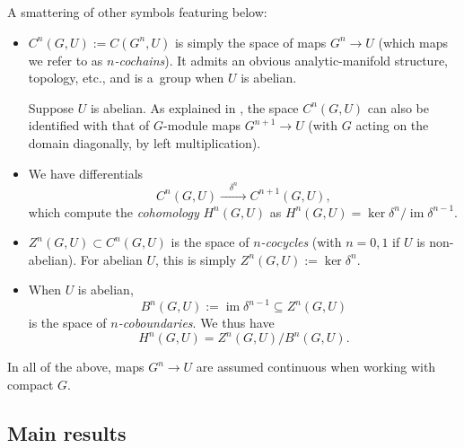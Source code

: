 \documentclass[11pt]{article}
\numberwithin{equation}{section}
\numberwithin{equation}{section}
\DeclareMathOperator{\im}{\mathrm{im}}
\begin{document}
A smattering of other symbols featuring below:
\begin{itemize}\itemsep=0pt
\item $C^n(G,U):=C(G^n,U)$ is simply the space of maps $G^n\to U$ (which maps we refer to as {\it $n$-cochains}). It admits an obvious analytic-manifold structure, topology, etc., and is a~group when $U$ is abelian.

 Suppose $U$ is abelian. As explained in \cite[Section~VII.3]{ser-lf}, the space $C^n(G,U)$ can also be identified with that of $G$-module maps $G^{n+1}\to U$ (with $G$ acting on the domain diagonally, by left multiplication).
\item We have differentials
\[C^n(G,U)\xrightarrow{\quad\delta^n\quad}C^{n+1}(G,U),\] which compute the {\it cohomology} $H^n(G,U)$ as $
 H^n(G,U) = \ker \delta^n/\im \delta^{n-1}$.

\item $Z^n(G,U)\subset C^n(G,U)$ is the space of {\it $n$-cocycles} (with $n=0,1$ if $U$ is non-abelian). For abelian $U$, this is simply $Z^n(G,U):=\ker \delta^n$.
\item When $U$ is abelian,
 \begin{equation*}
 B^n(G,U):=\im\delta^{n-1}\subseteq Z^n(G,U)
 \end{equation*}
 is the space of {\it $n$-coboundaries}. We thus have
 \begin{equation*}
 H^n(G,U) = Z^n(G,U)/B^n(G,U).
 \end{equation*}
\end{itemize}
In all of the above, maps $G^n\to U$ are assumed continuous when working with compact $G$.

\subsection{Main results}\label{subse:gpmain}
\end{document}
